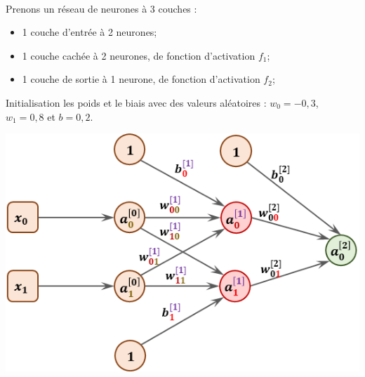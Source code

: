 \begin{exemple}~\\

\begin{minipage}[c]{.4\linewidth}

Prenons un réseau de neurones à 3 couches : 
\begin{itemize}
\item 1 couche d'entrée à 2 neurones;
\item 1 couche cachée à 2 neurones, de fonction d'activation $f_1$;
\item 1 couche de sortie à 1 neurone, de fonction d'activation $f_2$; 
\end{itemize}

Initialisation les poids et le biais avec des valeurs aléatoires : $w_0 = -0,3$, $w_1 = 0,8$ et $b=0,2$.



\end{minipage}\hfill
\begin{minipage}[c]{.55\linewidth}
\begin{center}
\includegraphics[width=.9\linewidth]{images/fig_05}
\end{center}
%
\end{minipage}


\end{exemple}
